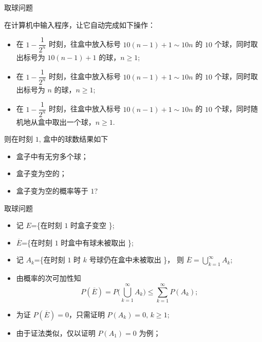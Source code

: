 \begin{frame}{取球问题}
	\begin{exam}
		在计算机中输入程序，让它自动完成如下操作：
		\begin{itemize}[<+-|alert@+>]
			\item 在 $1-\dfrac{1}{2^n}$ 时刻，往盒中放入标号 $10 (n-1)+1\sim 10n$ 的 $10$ 个球，同时取出标号为 $10 (n-1)+1$ 的球，$n\geq 1$;
			\item 在 $1-\dfrac{1}{2^n}$ 时刻，往盒中放入标号 $10 (n-1)+1\sim 10n$ 的 $10$ 个球，同时取出标号为 $n$ 的球，$n\geq 1$;
			\item 在 $1-\dfrac{1}{2^n}$ 时刻，往盒中放入标号 $10 (n-1)+1\sim 10n$ 的 $10$ 个球，同时随机地从盒中取出一个球，$n\geq 1$.
		\end{itemize}
	\pause
		则在时刻 $1$, 盒中的球数结果如下
		\begin{itemize}[<+-|alert@+>]
			\item 盒子中有无穷多个球；
			\item 盒子变为空的；
			\item 盒子变为空的概率等于 $1$?
		\end{itemize}
	\end{exam}
\end{frame}

\begin{frame}{取球问题}
	\jieda\
	\begin{itemize}[<+-|alert@+>]
		\item 记 $E$=\{在时刻 $1$ 时盒子变空 \};
		\item $\overline{E}$=\{在时刻 $1$ 时盒中有球未被取出 \};
		\item 记 $A_k$=\{在时刻 $1$ 时 $k$ 号球仍在盒中未被取出 \}， 则 \pause$\overline{E}=\bigcup\limits_{k=1}^{\infty} A_k$;\pause
		\item 由概率的次可加性知
		$$ P( \overline{E})= P\big(\bigcup_{k=1}^{\infty}A_k\big)\leq\sum_{k=1}^{\infty} P(A_k);$$
		\item 为证 $ P (\overline{E})=0$，只需证明 $P (A_k)=0,\,k\geq 1$;
		\item 由于证法类似，仅以证明 $ P (A_1)=0$ 为例；
	\end{itemize} %


\end{frame}

